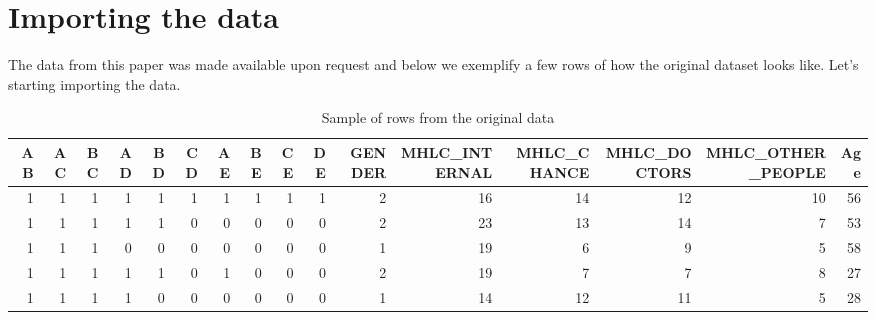 \documentclass[
]{book}
\newenvironment{Shaded}{\begin{snugshade}}{\end{snugshade}}
\newcommand{\CharTok}[1]{\textcolor[rgb]{0.31,0.60,0.02}{#1}}
\newcommand{\DataTypeTok}[1]{\textcolor[rgb]{0.13,0.29,0.53}{#1}}
\newcommand{\DecValTok}[1]{\textcolor[rgb]{0.00,0.00,0.81}{#1}}
\newcommand{\KeywordTok}[1]{\textcolor[rgb]{0.13,0.29,0.53}{\textbf{#1}}}
\newcommand{\NormalTok}[1]{#1}
\newcommand{\OperatorTok}[1]{\textcolor[rgb]{0.81,0.36,0.00}{\textbf{#1}}}
\newcommand{\StringTok}[1]{\textcolor[rgb]{0.31,0.60,0.02}{#1}}
\begin{document}
\hypertarget{importing-the-data-2}{%
\section{Importing the data}\label{importing-the-data-2}}

The data from this paper was made available upon request and below we exemplify a few rows of how the original dataset looks like.
Let's starting importing the data.

\begin{Shaded}
\end{Shaded}

\begin{table}

\caption{\label{tab:unnamed-chunk-75}Sample of rows from the original data}
\centering
\begin{tabular}[t]{r|r|r|r|r|r|r|r|r|r|r|r|r|r|r|r}
\hline
AB & AC & BC & AD & BD & CD & AE & BE & CE & DE & GENDER & MHLC\_INTERNAL & MHLC\_CHANCE & MHLC\_DOCTORS & MHLC\_OTHER\_PEOPLE & Age\\
\hline
1 & 1 & 1 & 1 & 1 & 1 & 1 & 1 & 1 & 1 & 2 & 16 & 14 & 12 & 10 & 56\\
\hline
1 & 1 & 1 & 1 & 1 & 0 & 0 & 0 & 0 & 0 & 2 & 23 & 13 & 14 & 7 & 53\\
\hline
1 & 1 & 1 & 0 & 0 & 0 & 0 & 0 & 0 & 0 & 1 & 19 & 6 & 9 & 5 & 58\\
\hline
1 & 1 & 1 & 1 & 1 & 0 & 1 & 0 & 0 & 0 & 2 & 19 & 7 & 7 & 8 & 27\\
\hline
1 & 1 & 1 & 1 & 0 & 0 & 0 & 0 & 0 & 0 & 1 & 14 & 12 & 11 & 5 & 28\\
\hline
\end{tabular}
\end{table}
\end{document}

